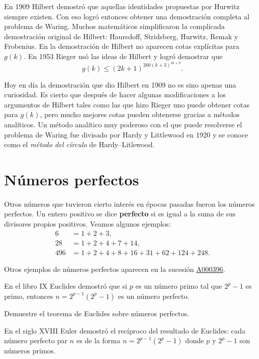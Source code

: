 En 1909 Hilbert demostró que aquellas identidades propuestas por Hurwitz
siempre existen. Con eso logró entonces obtener una demostración completa al
problema de Waring.  Muchos matemáticos simplificaron la complicada demostración
original de Hilbert: Haursdoff, Stridsberg, Hurwitz, Remak y Frobenius. En la
demostración de Hilbert no aparecen cotas explícitas para $g(k)$. En 1953
Rieger usó las ideas de Hilbert y logró demostrar que 
\[
	g(k)\leq (2k+1)^{260(k+3)^{3k+8}}.
\]

Hoy en día la demostración que dio Hilbert en 1909 no es sino apenas una
curiosidad. Es cierto que después de hacer algunas modificaciones a los
argumentos de Hilbert tales como las que hizo Rieger uno puede obtener cotas
para $g(k)$, pero mucho mejores cotas pueden obtenerse gracias a métodos
analíticos. Un método analítico muy poderoso con el que puede resolverse
el problema de Waring fue divisado por Hardy y Littlewood en 1920 y se conoce
como el \emph{método del círculo} de Hardy--Litlewood. 

\section*{Números perfectos}

Otros números que tuvieron cierto interés en épocas pasadas fueron los números
perfectos. Un entero positivo se dice \textbf{perfecto} si es igual a la suma
de sus divisores propios positivos. Veamos algunos ejemplos:
\begin{align*}
	6 &= 1+2+3,\\
	28 &= 1+2+4+7+14,\\
	496 &= 1 + 2 + 4 + 8 + 16 + 31 + 62 + 124 + 248.
\end{align*}

Otros ejemplos de números perfectos aparecen en la sucesión
\href{https://oeis.org/A000396}{A000396}.


En el libro IX Euclides demostró que si $p$ es un número primo tal que $2^p-1$
es primo, entonces $n=2^{p-1}(2^p-1)$ es un número perfecto. 

\begin{exercise}
	Demuestre el teorema de Euclides sobre números perfectos.
\end{exercise}

En el siglo XVIII
Euler demostró el recíproco del resultado de Euclides: cada número perfecto par
$n$ es de la forma $n=2^{p-1}(2^p-1)$ donde $p$ y $2^{p}-1$ son números primos. 

